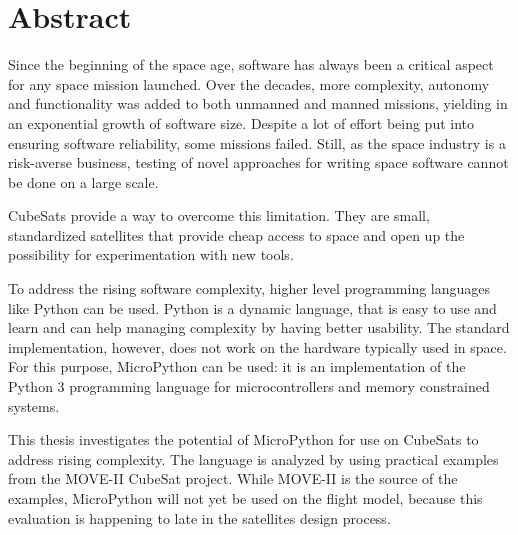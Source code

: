 \cleardoublepage
\section*{Abstract}

Since the beginning of the space age, software has always been a critical aspect for any space mission launched. Over the decades, more complexity, autonomy and functionality was added to both unmanned and manned missions, yielding in an exponential growth of software size. Despite a lot of effort being put into ensuring software reliability, some missions failed. Still, as the space industry is a risk-averse business, testing of novel approaches for writing space software cannot be done on a large scale.

CubeSats provide a way to overcome this limitation. They are small, standardized satellites that provide cheap access to space and open up the possibility for experimentation with new tools.

To address the rising software complexity, higher level programming languages like Python can be used. Python is a dynamic language, that is easy to use and learn and can help managing complexity by having better usability. The standard implementation, however, does not work on the hardware typically used in space. For this purpose, MicroPython can be used: it is an implementation of the Python 3 programming language for microcontrollers and memory constrained systems.

This thesis investigates the potential of MicroPython for use on CubeSats to address rising complexity. The language is analyzed by using practical examples from the MOVE-II CubeSat project. While MOVE-II is the source of the examples, MicroPython will not yet be used on the flight model, because this evaluation is happening to late in the satellites design process.

